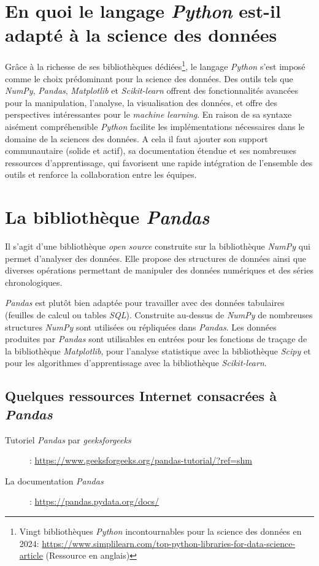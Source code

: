 \documentclass[a4paper,12pt]{book}
\begin{document}
\section{En quoi le langage \textit{Python} est-il adapté à la science des données}
Grâce à la richesse de ses bibliothèques dédiées\footnote{Vingt bibliothèques \textit{Python} incontournables pour la science des données en 2024: \url{https://www.simplilearn.com/top-python-libraries-for-data-science-article} (Ressource en anglais)}, le langage \textit{Python} s'est imposé comme le choix prédominant pour la science des données. Des outils tels que \textit{NumPy}, \textit{Pandas}, \textit{Matplotlib} et \textit{Scikit-learn} offrent des fonctionnalités avancées pour la manipulation, l'analyse, la visualisation des données, et offre des perspectives intéressantes pour le \textit{machine learning}. En raison de sa syntaxe aisément compréhensible \textit{Python} facilite les implémentations nécessaires dans le domaine de la sciences des données. A cela il faut ajouter son support communautaire (solide et actif), sa documentation étendue et ses nombreuses ressources d'apprentissage, qui favorisent une rapide intégration de l'ensemble des outils et renforce la collaboration entre les équipes.
\medskip

\section{La bibliothèque \textit{Pandas}}
Il s'agit d'une bibliothèque \textit{open source} construite sur la bibliothèque \textit{NumPy} qui permet d'analyser des données. Elle propose des structures de données ainsi que diverses opérations permettant de manipuler des données numériques et des séries chronologiques.
\medskip

\textit{Pandas} est plutôt bien adaptée pour travailler avec des données tabulaires (feuilles de calcul ou tables \textit{SQL}). Construite au-dessus de \textit{NumPy} de nombreuses structures \textit{NumPy} sont utilisées ou répliquées dans \textit{Pandas}. Les données produites par \textit{Pandas} sont utilisables en entrées pour les fonctions de traçage de la bibliothèque \textit{Matplotlib}, pour l'analyse statistique avec la bibliothèque \textit{Scipy} et pour les algorithmes d'apprentissage avec la bibliothèque \textit{Scikit-learn}.
\medskip

\subsection*{Quelques ressources Internet consacrées à \textit{Pandas}}
\begin{description}
	\item[Tutoriel \textit{Pandas} par \textit{geeksforgeeks}]: \url{https://www.geeksforgeeks.org/pandas-tutorial/?ref=shm}
	\item[La documentation \textit{Pandas}]: \url{https://pandas.pydata.org/docs/}
\end{description}
\medskip
\end{document}
